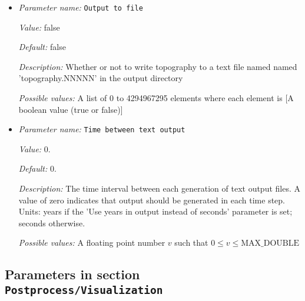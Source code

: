 \begin{itemize}
\item {\it Parameter name:} {\tt Output to file}
\label{parameters:Postprocess/Topography/Output to file}


{\it Value:} false


{\it Default:} false


{\it Description:} Whether or not to write topography to a text file named named 'topography.NNNNN' in the output directory


{\it Possible values:} A list of 0 to 4294967295 elements where each element is [A boolean value (true or false)]
\item {\it Parameter name:} {\tt Time between text output}
\label{parameters:Postprocess/Topography/Time between text output}


{\it Value:} 0.


{\it Default:} 0.


{\it Description:} The time interval between each generation of text output files. A value of zero indicates that output should be generated in each time step. Units: years if the 'Use years in output instead of seconds' parameter is set; seconds otherwise.


{\it Possible values:} A floating point number $v$ such that $0 \leq v \leq \text{MAX\_DOUBLE}$
\end{itemize}

\subsection{Parameters in section \tt Postprocess/Visualization}
\label{parameters:Postprocess/Visualization}

